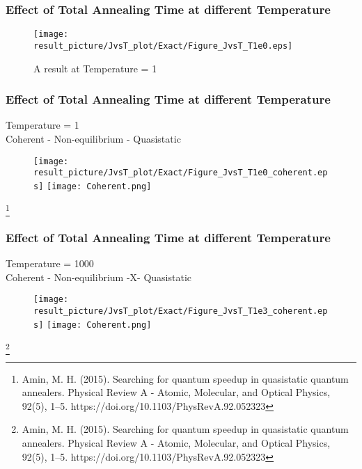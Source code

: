 \documentclass{beamer}
\begin{document}
\begin{frame}
	\frametitle{Effect of Total Annealing Time at different Temperature}
	
	\begin{figure}
		\centering
		\texttt{[image: result\_picture/JvsT\_plot/Exact/Figure\_JvsT\_T1e0.eps]}
		 \caption{A result at Temperature = 1}
	\end{figure}
\end{frame}

\begin{frame}
	\frametitle{Effect of Total Annealing Time at different Temperature}
	Temperature = 1\\
	Coherent - Non-equilibrium - Quasistatic
	\begin{figure}
		\centering
		\texttt{[image: result\_picture/JvsT\_plot/Exact/Figure\_JvsT\_T1e0\_coherent.eps]}
		\hfill
		\texttt{[image: Coherent.png]}\footnotemark[1]
	\end{figure}
	
	\footnote[1]{Amin, M. H. (2015). Searching for quantum speedup in quasistatic quantum annealers. Physical Review A - Atomic, Molecular, and Optical Physics, 92(5), 1–5. https://doi.org/10.1103/PhysRevA.92.052323}
\end{frame}

\begin{frame}
	\frametitle{Effect of Total Annealing Time at different Temperature}
	Temperature = 1000\\
	Coherent - Non-equilibrium -X- Quasistatic
	\begin{figure}
		\centering
		\texttt{[image: result\_picture/JvsT\_plot/Exact/Figure\_JvsT\_T1e3\_coherent.eps]}
		\hfill
		\texttt{[image: Coherent.png]}\footnotemark[1]		
	\end{figure}
	\footnote[1]{Amin, M. H. (2015). Searching for quantum speedup in quasistatic quantum annealers. Physical Review A - Atomic, Molecular, and Optical Physics, 92(5), 1–5. https://doi.org/10.1103/PhysRevA.92.052323}
\end{frame}
\end{document}

